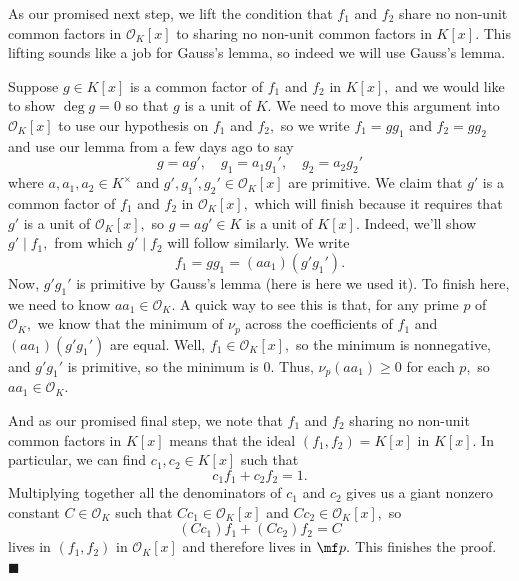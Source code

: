 As our promised next step, we lift the condition that $f_1$ and $f_2$ share no non-unit common factors in $\mathcal O_K[x]$ to sharing no non-unit common factors in $K[x].$ This lifting sounds like a job for Gauss's lemma, so indeed we will use Gauss's lemma.

Suppose $g\in K[x]$ is a common factor of $f_1$ and $f_2$ in $K[x],$ and we would like to show $\deg g=0$ so that $g$ is a unit of $K.$ We need to move this argument into $\mathcal O_K[x]$ to use our hypothesis on $f_1$ and $f_2,$ so we write $f_1=gg_1$ and $f_2=gg_2$ and use our lemma from a few days ago to say
\[g=ag',\quad g_1=a_1g_1',\quad g_2=a_2g_2'\]
where $a,a_1,a_2\in K^\times$ and $g',g_1',g_2'\in\mathcal O_K[x]$ are primitive. We claim that $g'$ is a common factor of $f_1$ and $f_2$ in $\mathcal O_K[x],$ which will finish because it requires that $g'$ is a unit of $\mathcal O_K[x],$ so $g=ag'\in K$ is a unit of $K[x].$ Indeed, we'll show $g'\mid f_1,$ from which $g'\mid f_2$ will follow similarly. We write
\[f_1=gg_1=(aa_1)(g'g_1').\]
Now, $g'g_1'$ is primitive by Gauss's lemma (here is here we used it). To finish here, we need to know $aa_1\in\mathcal O_K.$ A quick way to see this is that, for any prime $p$ of $\mathcal O_K,$ we know that the minimum of $\nu_p$ across the coefficients of $f_1$ and $(aa_1)(g'g_1')$ are equal. Well, $f_1\in\mathcal O_K[x],$ so the minimum is nonnegative, and $g'g_1'$ is primitive, so the minimum is $0.$ Thus, $\nu_p(aa_1)\ge0$ for each $p,$ so $aa_1\in\mathcal O_K.$

And as our promised final step, we note that $f_1$ and $f_2$ sharing no non-unit common factors in $K[x]$ means that the ideal $(f_1,f_2)=K[x]$ in $K[x].$ In particular, we can find $c_1,c_2\in K[x]$ such that
\[c_1f_1+c_2f_2=1.\]
Multiplying together all the denominators of $c_1$ and $c_2$ gives us a giant nonzero constant $C\in\mathcal O_K$ such that $Cc_1\in\mathcal O_K[x]$ and $Cc_2\in\mathcal O_K[x],$ so
\[(Cc_1)f_1+(Cc_2)f_2=C\]
lives in $(f_1,f_2)$ in $\mathcal O_K[x]$ and therefore lives in $\mf p.$ This finishes the proof. $\blacksquare$

